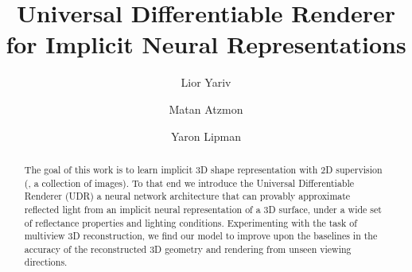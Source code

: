 \documentclass[runningheads]{llncs}
\begin{document}
\pagestyle{headings}
\mainmatter
\def\ECCVSubNumber{5237}  %

\title{Universal Differentiable Renderer \\for Implicit Neural Representations} %

%
\author{Lior Yariv \and
Matan Atzmon \and
Yaron Lipman}
%
%
\maketitle

\begin{abstract}
The goal of this work is to learn implicit 3D shape representation with 2D supervision (\ie, a collection of images).  To that end we introduce the Universal Differentiable Renderer (UDR) a neural network architecture that can provably approximate reflected light from an implicit neural representation of a 3D surface, under a wide set of reflectance properties and lighting conditions. Experimenting with the task of multiview 3D reconstruction, we find our model to improve upon the baselines in the accuracy of the reconstructed 3D geometry and rendering from unseen viewing directions.



\end{abstract}
\end{document}
